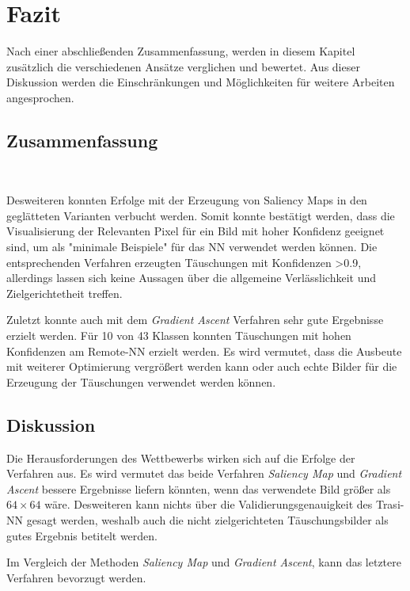 \chapter{Fazit}
\label{cha:Fazit} \label{cha:Schluss}
Nach einer abschließenden Zusammenfassung, werden in diesem Kapitel zusätzlich die verschiedenen Ansätze verglichen und bewertet. Aus dieser Diskussion werden die Einschränkungen und Möglichkeiten für weitere Arbeiten angesprochen.

\section{Zusammenfassung} ~\newline 
{}

Desweiteren konnten Erfolge mit der Erzeugung von Saliency Maps in den geglätteten Varianten verbucht werden. Somit konnte bestätigt werden, dass die Visualisierung der Relevanten Pixel für ein Bild mit hoher Konfidenz geeignet sind, um als "minimale Beispiele" für das NN verwendet werden können. Die entsprechenden Verfahren erzeugten Täuschungen mit Konfidenzen >0.9, allerdings lassen sich keine Aussagen über die allgemeine Verlässlichkeit und Zielgerichtetheit treffen.

Zuletzt konnte auch mit dem \textit{Gradient Ascent} Verfahren sehr gute Ergebnisse erzielt werden. Für 10 von 43 Klassen konnten Täuschungen mit hohen Konfidenzen am Remote-NN erzielt werden. Es wird vermutet, dass die Ausbeute mit weiterer Optimierung vergrößert werden kann oder auch echte Bilder für die Erzeugung der Täuschungen verwendet werden können.



\section{Diskussion}
Die Herausforderungen des Wettbewerbs wirken sich auf die Erfolge der Verfahren aus. Es wird vermutet das beide Verfahren \textit{Saliency Map} und \textit{Gradient Ascent} bessere Ergebnisse liefern könnten, wenn das verwendete Bild größer als $64\times64$ wäre. Desweiteren kann nichts über die Validierungsgenauigkeit des Trasi-NN gesagt werden, weshalb auch die nicht zielgerichteten Täuschungsbilder als gutes Ergebnis betitelt werden. 


Im Vergleich der Methoden \textit{Saliency Map} und \textit{Gradient Ascent}, kann das letztere Verfahren bevorzugt werden. 





